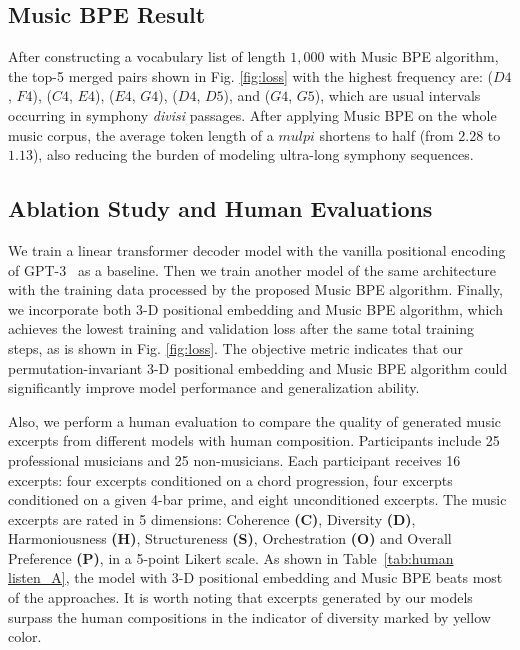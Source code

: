 \documentclass{article}
\begin{document}
\subsection{Music BPE Result}
After constructing a vocabulary list of length $1,000$ with Music BPE algorithm, the top-5 merged pairs shown in Fig. \ref{fig:loss} with the highest frequency are: ($D4$, $F4$), ($C4$, $E4$), ($E4$, $G4$), ($D4$, $D5$), and ($G4$, $G5$), which are usual intervals occurring in symphony \emph{divisi} passages. After applying Music BPE on the whole music corpus, the average token length of a $mulpi$ shortens to half (from $2.28$ to $1.13$), also reducing the burden of modeling ultra-long symphony sequences.

\subsection{Ablation Study and Human Evaluations}
We train a linear transformer decoder model with the vanilla positional encoding of GPT-3~\cite{brown2020language} as a baseline. Then we train another model of the same architecture with the training data processed by the proposed Music BPE algorithm. Finally, we incorporate both 3-D positional embedding and Music BPE algorithm, which achieves the lowest training and validation loss after the same total training steps, as is shown in Fig. \ref{fig:loss}. The objective metric indicates that our permutation-invariant 3-D positional embedding and Music BPE algorithm could significantly improve  model performance and generalization ability.

Also, we perform a human evaluation to compare the quality of generated music excerpts from different models with human composition. Participants include 25 professional musicians and 25 non-musicians. Each participant receives 16 excerpts: four excerpts conditioned on a chord progression, four excerpts conditioned on a given 4-bar prime, and eight unconditioned excerpts. The music excerpts are rated in 5 dimensions: Coherence \textbf{(C)}, Diversity \textbf{(D)}, Harmoniousness \textbf{(H)}, Structureness \textbf{(S)}, Orchestration \textbf{(O)} and Overall Preference \textbf{(P)}, in a 5-point Likert scale. As shown in Table~\ref{tab:human listen_A}, the model with 3-D positional embedding and Music BPE beats most of the approaches. It is worth noting that excerpts generated by our models surpass the human compositions in the indicator of diversity marked by yellow color.
\end{document}
